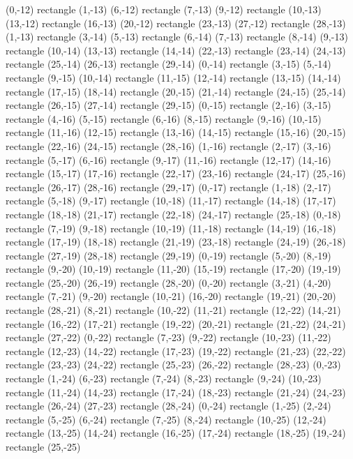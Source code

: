 {  (0,-12) rectangle (1,-13) (6,-12) rectangle (7,-13) (9,-12) rectangle (10,-13) (13,-12) rectangle (16,-13) (20,-12) rectangle (23,-13) (27,-12) rectangle (28,-13)%
  (1,-13) rectangle (3,-14) (5,-13) rectangle (6,-14) (7,-13) rectangle (8,-14) (9,-13) rectangle (10,-14) (13,-13) rectangle (14,-14) (22,-13) rectangle (23,-14) (24,-13) rectangle (25,-14) (26,-13) rectangle (29,-14)%
  (0,-14) rectangle (3,-15) (5,-14) rectangle (9,-15) (10,-14) rectangle (11,-15) (12,-14) rectangle (13,-15) (14,-14) rectangle (17,-15) (18,-14) rectangle (20,-15) (21,-14) rectangle (24,-15) (25,-14) rectangle (26,-15) (27,-14) rectangle (29,-15)%
  (0,-15) rectangle (2,-16) (3,-15) rectangle (4,-16) (5,-15) rectangle (6,-16) (8,-15) rectangle (9,-16) (10,-15) rectangle (11,-16) (12,-15) rectangle (13,-16) (14,-15) rectangle (15,-16) (20,-15) rectangle (22,-16) (24,-15) rectangle (28,-16)%
  (1,-16) rectangle (2,-17) (3,-16) rectangle (5,-17) (6,-16) rectangle (9,-17) (11,-16) rectangle (12,-17) (14,-16) rectangle (15,-17) (17,-16) rectangle (22,-17) (23,-16) rectangle (24,-17) (25,-16) rectangle (26,-17) (28,-16) rectangle (29,-17)%
  (0,-17) rectangle (1,-18) (2,-17) rectangle (5,-18) (9,-17) rectangle (10,-18) (11,-17) rectangle (14,-18) (17,-17) rectangle (18,-18) (21,-17) rectangle (22,-18) (24,-17) rectangle (25,-18)%
  (0,-18) rectangle (7,-19) (9,-18) rectangle (10,-19) (11,-18) rectangle (14,-19) (16,-18) rectangle (17,-19) (18,-18) rectangle (21,-19) (23,-18) rectangle (24,-19) (26,-18) rectangle (27,-19) (28,-18) rectangle (29,-19)%
  (0,-19) rectangle (5,-20) (8,-19) rectangle (9,-20) (10,-19) rectangle (11,-20) (15,-19) rectangle (17,-20) (19,-19) rectangle (25,-20) (26,-19) rectangle (28,-20)%
  (0,-20) rectangle (3,-21) (4,-20) rectangle (7,-21) (9,-20) rectangle (10,-21) (16,-20) rectangle (19,-21) (20,-20) rectangle (28,-21)%
  (8,-21) rectangle (10,-22) (11,-21) rectangle (12,-22) (14,-21) rectangle (16,-22) (17,-21) rectangle (19,-22) (20,-21) rectangle (21,-22) (24,-21) rectangle (27,-22)%
  (0,-22) rectangle (7,-23) (9,-22) rectangle (10,-23) (11,-22) rectangle (12,-23) (14,-22) rectangle (17,-23) (19,-22) rectangle (21,-23) (22,-22) rectangle (23,-23) (24,-22) rectangle (25,-23) (26,-22) rectangle (28,-23)%
  (0,-23) rectangle (1,-24) (6,-23) rectangle (7,-24) (8,-23) rectangle (9,-24) (10,-23) rectangle (11,-24) (14,-23) rectangle (17,-24) (18,-23) rectangle (21,-24) (24,-23) rectangle (26,-24) (27,-23) rectangle (28,-24)%
  (0,-24) rectangle (1,-25) (2,-24) rectangle (5,-25) (6,-24) rectangle (7,-25) (8,-24) rectangle (10,-25) (12,-24) rectangle (13,-25) (14,-24) rectangle (16,-25) (17,-24) rectangle (18,-25) (19,-24) rectangle (25,-25)%
}
